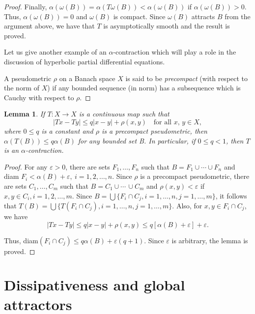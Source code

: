 \documentclass{surv-l}
\theoremstyle{plain}
\newtheorem{lemma}[theorem]{Lemma}
\theoremstyle{definition}
\numberwithin{equation}{section}
\numberwithin{figure}{chapter}
\begin{document}
\begin{proof}
Finally, $\alpha(\omega(B))=\alpha(T\omega(B))<\alpha(\omega(B))$ if $\alpha(\omega(B))>0$. Thus, $\alpha(\omega(B))=0$ and $\omega(B)$ is compact. Since $\omega(B)$ attracts $B$ from the argument above, we have that $T$ is asymptotically smooth and the result is proved.

Let us give another example of an $\alpha$-contraction which will play a role in the discussion of hyperbolic partial differential equations.

A pseudometric $\rho$ on a Banach space $X$ is said to be \emph{precompact} (with respect to the norm of $X$) if any bounded sequence (in norm) has a subsequence which is Cauchy with respect to $\rho$.
\end{proof}

\begin{lemma}\label{lem2.3.6} If $T\!:X\rightarrow X$ is a continuous map such that
\begin{equation*}
|Tx-Ty|\leq q|x-y|+\rho(x,y)\quad \text{for all } x,\, y\in X,
\end{equation*}
where $0\leq q$ is a constant and $\rho$ is a precompact pseudometric, then $\alpha(T(B))\leq q\alpha(B)$ for any bounded set B. In particular, if $0\leq q<1$, then $T$ is an $\alpha$-contraction.
\end{lemma}

\begin{proof}
For any $\varepsilon >0$, there are sets $F_{1},\ldots, F_{n}$ such that $B=F_{1}\cup\cdots\cup F_{n}$ and diam $ F_{i}<\alpha(B)+\varepsilon,\ i=1,2,\ldots,n$. Since $\rho$ is a precompact pseudometric, there are sets $C_{1},\ldots, C_{m}$ such that $ B=C_{1}\cup\cdots\,{\cup} C_{m}$ and $\rho(x, y)<\varepsilon$ if $x, y\in C_{i}, i=1,2,\ldots, m$. Since $B=\bigcup\{F_{i}\cap C_{j}, i=1, \ldots, n, j=1, \ldots, m\}$, it follows that $T(B)=\bigcup\{T(F_{i}\cap C_{j}), i=1, \ldots, n, j=1, \ldots, m\}.$ Also, for $x, y\in F_{i}\cap C_{j}$, we have
\begin{equation*}
|Tx-Ty|\leq q|x-y|+\rho(x, y)\leq q[\alpha(B)+\varepsilon]+\varepsilon.
\end{equation*}

Thus, diam$(F_{i}\cap C_{j})\leq q\alpha(B)+\varepsilon(q+1)$. Since $\varepsilon$ is arbitrary, the lemma is proved.
\end{proof}

\section{Dissipativeness and global attractors}\label{sec2.4}
\end{document}
